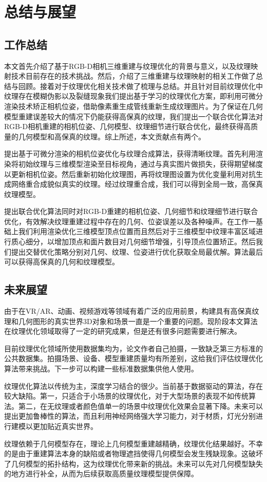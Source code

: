 \summary
\chapter{总结与展望}

\section{工作总结}
本文首先介绍了基于RGB-D相机三维重建与纹理优化的背景与意义，以及纹理映射技术目前存在的技术挑战。然后，介绍了三维重建与纹理映射的相关工作做了总结与回顾。接着对于纹理优化相关技术做了梳理与总结。并且针对目前纹理优化中纹理存在模糊伪影以及裂缝现象我们提出基于学习的纹理优化方案，即利用可微分渲染技术矫正相机位姿，借助像素重生成管线重新生成纹理图片。为了保证在几何模型重建误差较大的情况下仍能获得高保真的纹理，我们提出一个联合优化算法对RGB-D相机重建的相机位姿、几何模型、纹理细节进行联合优化，最终获得高质量的几何模型和高保真的纹理。综上所述，本文贡献点有两个。\par
提出基于可微分渲染的相机位姿优化与纹理合成算法，获得清晰纹理。首先利用渲染将初始纹理与三维模型渲染至目标视角，通过与真实图片做损失，获得期望梯度以更新相机位姿。然后重新初始化纹理图，再将纹理图设置为优化变量利用对抗生成网络重合成貌似真实的纹理。经过纹理重合成，我们可以得到全局一致，高保真纹理模型。\par
提出联合优化算法同时对RGB-D重建的相机位姿、几何细节和纹理细节进行联合优化，有效解决纹理重建过程中存在的几何、位姿误差以及各种噪声。在工作一基础上我们利用渲染优化三维模型顶点位置而且然后对于三维模型中纹理丰富区域进行质心细分，以增加顶点和面片数目对几何细节增强，引导顶点位置矫正。然后我们提出交替优化策略分别对几何、纹理、位姿进行优化获取全局最优解。算法最后可以获得高保真的几何和纹理模型。
\section{未来展望}
由于在VR/AR、动画、视频游戏等领域有着广泛的应用前景，构建具有高保真纹理和几何图形的真实世界3D对象和场景一直是一个重要的问题。现阶段本文算法在纹理优化领域取得了一定的研究成果，但是还有很多问题需要进行解决。\par
目前纹理优化领域所使用数据集均为，论文作者自己拍摄，一致缺乏第三方标准的公共数据集。拍摄场景、设备、模型重建质量均有所差别，这给我们评估纹理优化算法带来挑战。下一步可以构建一些标准数据集供他人使用。\par
纹理优化算法以传统为主，深度学习结合的很少。当前基于数据驱动的算法，存在较大缺陷。第一，只适合于小场景的纹理优化，对于大型场景的表现不如传统算法。第二，在无纹理或者颜色值单一的场景中纹理优化效果会显著下降。未来可以提出更加鲁棒性的算法，而且利用神经网络强大学习能力，对于材质，灯光分别进行建模以更加贴近真实世界。\par
纹理依赖于几何模型存在，理论上几何模型重建越精确，纹理优化结果越好。不幸的是由于重建算法本身的缺陷或者物理遮挡使得几何模型会发生残缺现象。这破坏了几何模型的拓扑结构，这为纹理优化带来新的挑战。未来可以先对几何模型缺失的地方进行补全，从而为后续获取高质量纹理模型提供保障。